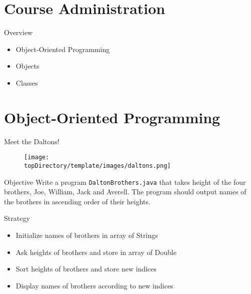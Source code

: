 \documentclass[10pt, compress]{beamer}
\begin{document}
\prepareCover

\section{Course Administration}

\begin{slide}
	\begin{block}{Overview}
		\begin{itemize}
			\item[] Object-Oriented Programming
			\item[] Objects
			\item[] Classes
		\end{itemize}
	\end{block}
\end{slide}

\section{Object-Oriented Programming}

\begin{slide}
	\begin{block}{Meet the Daltons!}
		\begin{figure}[H]\centering
			\texttt{[image: \\topDirectory/template/images/daltons.png]}
		\end{figure}
	\end{block}
\end{slide}

\begin{slide}
	\begin{block}{Objective}
		Write a program \texttt{DaltonBrothers.java} that takes height of the four brothers, Joe, William, Jack and Averell.
		The program should output names of the brothers in ascending order of their heights.
	\end{block}
\end{slide}

\begin{slide}
	\begin{block}{Strategy}
		\begin{itemize}
			\item[] Initialize names of brothers in array of Strings
			\item[] Ask heights of brothers and store in array of Double
			\item[] Sort heights of brothers and store new indices
			\item[] Display names of brothers according to new indices
		\end{itemize}
	\end{block}
\end{slide}
\end{document}
